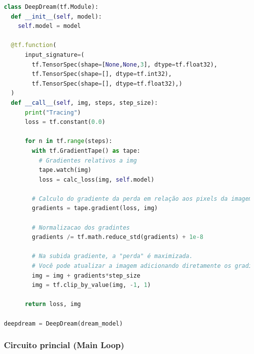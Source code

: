 \begin{lstlisting}[language=Python, style=input]
class DeepDream(tf.Module):
  def __init__(self, model):
    self.model = model

  @tf.function(
      input_signature=(
        tf.TensorSpec(shape=[None,None,3], dtype=tf.float32),
        tf.TensorSpec(shape=[], dtype=tf.int32),
        tf.TensorSpec(shape=[], dtype=tf.float32),)
  )
  def __call__(self, img, steps, step_size):
      print("Tracing")
      loss = tf.constant(0.0)

      for n in tf.range(steps):
        with tf.GradientTape() as tape:
          # Gradientes relativos a img
          tape.watch(img)
          loss = calc_loss(img, self.model)

        # Calculo do gradiente da perda em relação aos pixels da imagem de entrada.
        gradients = tape.gradient(loss, img)

        # Normalizacao dos gradintes
        gradients /= tf.math.reduce_std(gradients) + 1e-8

        # Na subida gradiente, a "perda" é maximizada.
        # Você pode atualizar a imagem adicionando diretamente os gradientes (porque eles têm o mesmo formato!)
        img = img + gradients*step_size
        img = tf.clip_by_value(img, -1, 1)

      return loss, img

deepdream = DeepDream(dream_model)
\end{lstlisting}
\subsubsection*{Circuito princial (Main Loop)}

